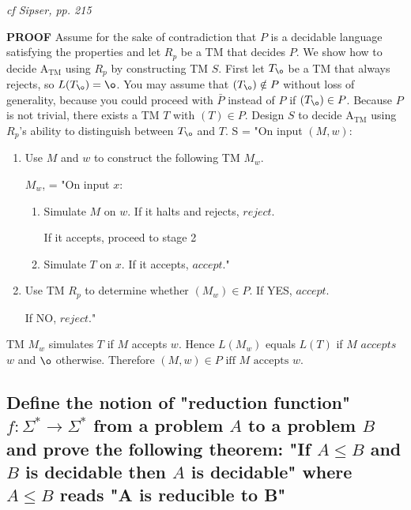 \documentclass[main.tex]{subfiles}
\begin{document}
\emph{cf Sipser, pp. 215}
\par\textbf{PROOF}
Assume for the sake of contradiction that $P$ is a decidable language satisfying the
properties and let $R_p$ be a TM that decides $P$. We show how to decide $\text{A}_\text{TM}$ using $R_p$ by constructing TM $S$. First let $T_{\o}$ be a TM that always rejects, so $L(T_{\o}) = \o$.
You may assume that $(T_{\o}) \notin P$ without loss of generality, because you could proceed with $\bar{P}$ instead of $P$ if $(T_{\o}) \in P$. Because $P$ is not trivial, there exists a TM $T$ with $(T) \in P$. Design $S$ to decide $\text{A}_\text{TM}$ using $R_p$'s ability to distinguish between $T_{\o}$ and $T$.
S = "On input $(M, w)$:
\begin{enumerate}
    \item Use $M$ and $w$ to construct the following TM $M_w$.
    \par $M_w$, = "On input $x$:
        \begin{enumerate}
            \item Simulate $M$ on $w$. If it halts and rejects, $reject$.
            \par If it accepts, proceed to stage 2
            \item Simulate $T$ on $x$. If it accepts, $accept$."
        \end{enumerate}{}
    \item Use TM $R_p$ to determine whether $(M_w) \in P$. If YES, $accept$.
    \par If NO, $reject$."
\end{enumerate}{}

TM $M_w$ simulates $T$ if $M$ accepts $w$. Hence $L(M_w)$ equals $L(T)$ if $M$ $accepts$ $w$ and $\o$ otherwise. Therefore $(M, w) \in P \text{ iff } M \text{ accepts } w$.


\subsection{Define the notion of "reduction function" $f : \Sigma^{*} \rightarrow \Sigma^{*}$ from a problem $A$ to a problem $B$ and prove the following theorem: "If $A \leq B$ and $B$ is decidable then $A$ is decidable" where $A \leq B$ reads "A is reducible to B"}
\end{document}
